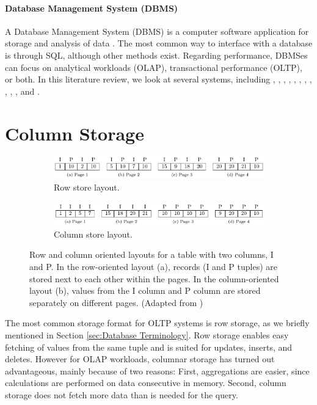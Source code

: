 \paragraph{Database Management System (DBMS)}
\label{par:Database Management System (DBMS)}
A Database Management System (DBMS) is a computer software application for storage and analysis of data \cite{Wikipedia_contributors2015-pb}. The most common way to interface with a database is through SQL, although other methods exist. Regarding performance, DBMSes can focus on analytical workloads (OLAP), transactional performance (OLTP), or both. In this literature review, we look at several systems, including \oracle, \ibm, \saph, \sapnw, \mssql, \cstore, \vertica, \blink, \exasol, \oracle, \hyper, and \hyrise. 

\section{Column Storage}
\label{sec:Column Storage}

\begin{figure}
  \centering
  \begin{subfigure}{\textwidth}
    \includegraphics[width=\textwidth]{img/row-store.png}
    \caption{Row store layout.}
    \label{fig:row-column-store-1} 
  \end{subfigure}
  \begin{subfigure}{\textwidth}
    \includegraphics[width=\textwidth]{img/column-store.png}
    \caption{Column store layout.}
    \label{fig:row-column-store-2} 
  \end{subfigure}
  \caption{Row and column oriented layouts for a table with two columns, I and P. In the row-oriented layout (a), records (I and P tuples) are stored next to each other within the pages. In the column-oriented layout (b), values from the I column and P column are stored separately on different pages. (Adapted from \cite{Bjorklund2011-wh})}
  \label{fig:row-column-store} 
\end{figure}

The most common storage format for OLTP systems is row storage, as we briefly mentioned in Section \ref{sec:Database Terminology}. Row storage enables easy fetching of values from the same tuple and is suited for updates, inserts, and deletes. However for OLAP workloads, columnar storage has turned out advantageous, mainly because of two reasons: First, aggregations are easier, since calculations are performed on data consecutive in memory. Second, column storage does not fetch more data than is needed for the query.

